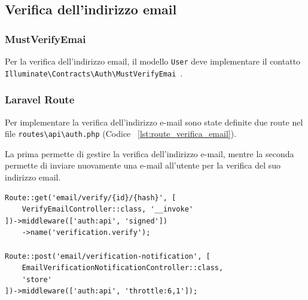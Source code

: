 \subsection{Verifica dell'indirizzo email}
\subsubsection{MustVerifyEmai}
Per la verifica dell'indirizzo email, il modello \verb|User| deve implementare il contatto \verb|Illuminate\Contracts\Auth\MustVerifyEmai|~\cite{LaravelEmailVerification}.
\subsubsection{Laravel Route}
Per implementare la verifica dell'indirizzo e-mail sono state definite due route nel file \verb|routes\api\auth.php| (Codice ~\ref{lst:route_verifica_email}).

La prima permette di gestire la verifica dell'indirizzo e-mail, mentre la seconda permette di inviare nuovamente una e-mail all'utente per la verifica del suo indirizzo email.
\begin{lstlisting}[caption={Route per la verifica dell'indirizzo e-mail}, label={lst:route_verifica_email}]
Route::get('email/verify/{id}/{hash}', [
	VerifyEmailController::class, '__invoke'
])->middleware(['auth:api', 'signed'])
	->name('verification.verify');

Route::post('email/verification-notification', [
	EmailVerificationNotificationController::class,
	'store'
])->middleware(['auth:api', 'throttle:6,1']);
\end{lstlisting}

